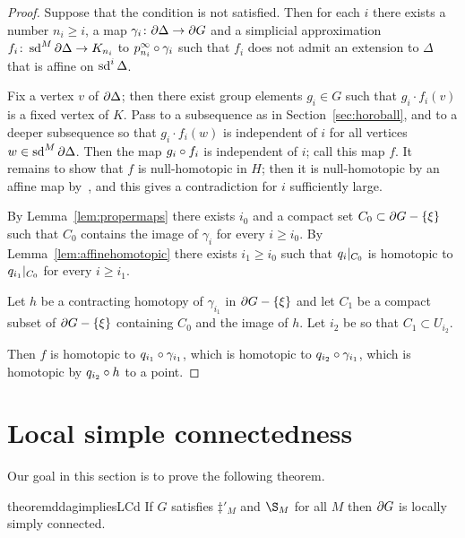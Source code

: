 \documentclass[a4paper]{article}
\begin{document}
\begin{proof}
  Suppose that the condition is not satisfied. Then for each $i$ there exists a
  number $n_i \geq i$, a map $\gamma_i \colon \partial\Delta \to \partial G$
  and a simplicial approximation $f_i \colon \operatorname{sd}^M \partial\Delta \to K_{n_i}$
  to $p^\infty_{n_i}\circ\gamma_i$ such that $f_i$ does not admit an
  extension to $\Delta$ that is affine on $\operatorname{sd}^i\Delta$.

  Fix a vertex $v$ of $\partial\Delta$; then there exist group elements $g_i
  \in G$ such that $g_i\cdot f_i(v)$ is a fixed vertex of $K$. Pass to a
  subsequence as in Section~\ref{sec:horoball}, and to a deeper subsequence so
  that $g_i\cdot f_i(w)$ is independent of $i$ for all vertices $w \in \operatorname{sd}^M
  \partial\Delta$. Then the map $g_i\circ f_i$ is independent of $i$; call
  this map $f$. It remains to show that $f$ is null-homotopic in $H$; then it is
  null-homotopic by an affine map by~\cite{zeeman64}, and this gives a
  contradiction for $i$ sufficiently large.

  By Lemma~\ref{lem:propermaps} there exists $i_0$ and a 
  compact set $C_0 \subset \partial G - \left\{\xi\right\}$ such that $C_0$ contains the
  image of $\gamma_i$ for every $i \geq i_0$. By
  Lemma~\ref{lem:affinehomotopic} there exists $i_1 \geq i_0$ such that
  $q_i\vert_{C_0}$ is homotopic to $q_{i_1}\vert_{C_0}$ for every $i
  \geq i_1$.  
  
  Let $h$ be a contracting homotopy of $\gamma_{i_1}$ in $\partial G -
  \left\{\xi\right\}$ and let $C_1$ be a compact subset of $\partial G - \left\{\xi\right\}$
  containing $C_0$ and the image of $h$. Let $i_2$ be so that $C_1 \subset
  U_{i_2}$.

  Then $f$ is homotopic to $q_{i_1}\circ\gamma_{i_1}$, which is homotopic
  to $q_{i_2}\circ\gamma_{i_1}$, which is homotopic by $q_{i_2}\circ h$
  to a point.
\end{proof}

\section{Local simple connectedness}

Our goal in this section is to prove the following theorem.

\begin{restatable}{theorem}{ddagimpliesLCd}\label{thm:ddagimpliesLCd}
  If $G$ satisfies $\ddag'_M$ and $\S_M$ for all $M$ then $\partial G$ is
  locally simply connected.
\end{restatable}
\end{document}
